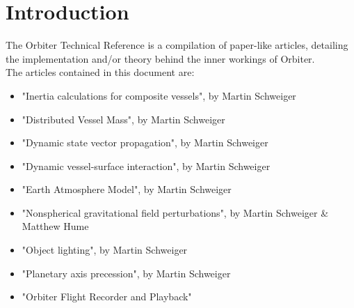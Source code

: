 \documentclass[Orbiter Technical Reference.tex]{subfiles}
\begin{document}
\section{Introduction}
The Orbiter Technical Reference is a compilation of paper-like articles, detailing the implementation and/or theory behind the inner workings of Orbiter.\\
The articles contained in this document are:

\begin{itemize}
\item "Inertia calculations for composite vessels", by Martin Schweiger
\item "Distributed Vessel Mass", by Martin Schweiger
\item "Dynamic state vector propagation", by Martin Schweiger
\item "Dynamic vessel-surface interaction", by Martin Schweiger
\item "Earth Atmosphere Model", by Martin Schweiger
\item "Nonspherical gravitational field perturbations", by Martin Schweiger \& Matthew Hume
\item "Object lighting", by Martin Schweiger
\item "Planetary axis precession", by Martin Schweiger
\item "Orbiter Flight Recorder and Playback"
\end{itemize}
\end{document}
